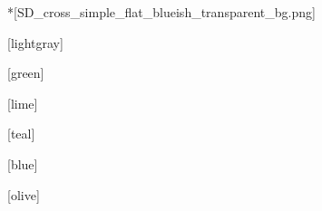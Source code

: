 
\newcommand{\subbooktitle}{a compilação completa}





  
  \imprintpage

  \toc

  \setcounter{chapter}{0}

  *[SD_cross_simple_flat_blueish_transparent_bg.png]
    

  [lightgray]
    \begin{songs}{}
      
    \end{songs}

  [green]
    \begin{songs}{}
      
    \end{songs}

  [lime]
    \begin{songs}{}
      
    \end{songs}

  [teal]
    \begin{songs}{}
      
    \end{songs}

  [blue]
    \begin{songs}{}
      
    \end{songs}

  [olive]
    \begin{songs}{}
      
    \end{songs}

